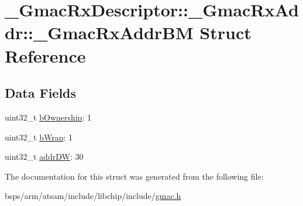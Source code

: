 \hypertarget{struct__GmacRxDescriptor_1_1__GmacRxAddr_1_1__GmacRxAddrBM}{}\section{\+\_\+\+Gmac\+Rx\+Descriptor\+::\+\_\+\+Gmac\+Rx\+Addr\+::\+\_\+\+Gmac\+Rx\+Addr\+BM Struct Reference}
\label{struct__GmacRxDescriptor_1_1__GmacRxAddr_1_1__GmacRxAddrBM}
\subsection*{Data Fields}
\begin{DoxyCompactItemize}
\item 
uint32\+\_\+t \mbox{\hyperlink{group__gmac__defines_gabe36538aa63ed4d083eb80dcaf9288e5}{b\+Ownership}}\+: 1
\item 
uint32\+\_\+t \mbox{\hyperlink{group__gmac__defines_gae5d7e7953d3959acddd6b70f99b4ddc9}{b\+Wrap}}\+: 1
\item 
uint32\+\_\+t \mbox{\hyperlink{group__gmac__defines_ga6debab2368d4f0df7f6493cc059576f5}{addr\+DW}}\+: 30
\end{DoxyCompactItemize}


The documentation for this struct was generated from the following file\+:\begin{DoxyCompactItemize}
\item 
bsps/arm/atsam/include/libchip/include/\mbox{\hyperlink{gmac_8h}{gmac.\+h}}\end{DoxyCompactItemize}
